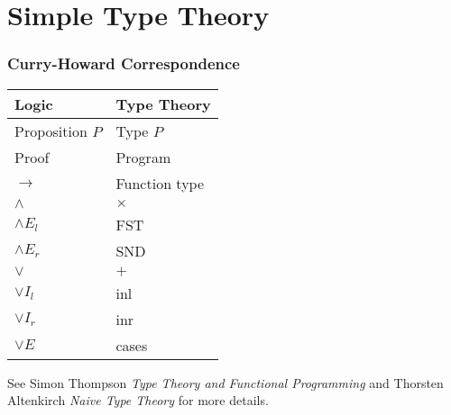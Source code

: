 \documentclass{beamer}
\theoremstyle{indentDefn} \newtheorem{defn}[]{Definition}
\begin{document}







\section{Simple Type Theory}

\begin{frame}
  \frametitle{Curry-Howard Correspondence}

  \begin{center}
    \begin{tabular}{l|l}
      Logic & Type Theory \\
      \hline
      Proposition $P$ & Type $P$ \\
      Proof & Program \\
      $\to$ & Function type \\
      $\land$ & $\times$ \\
      $\land E_{l}$ & FST \\
      $\land E_{r}$ & SND \\
      $\lor$ & $+$\\ 
      $\lor I_{l}$ & inl \\
      $\lor I_{r}$ & inr \\
      $\lor E$ & cases  
    \end{tabular}
  \end{center}
  
  See Simon Thompson \emph{Type Theory and Functional Programming} \cite{thompson} and Thorsten Altenkirch \emph{Naive Type Theory} \cite{naiveTT} for more details.
\end{frame}
\end{document}
